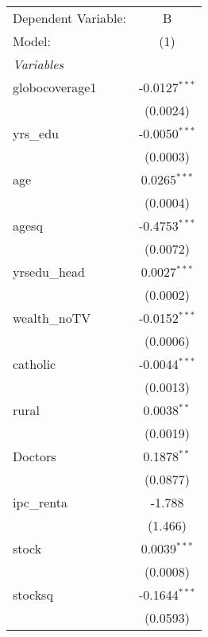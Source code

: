 
\begingroup
\centering
\begin{tabular}{lc}
   \tabularnewline \midrule \midrule
   Dependent Variable:                & B\\  
   Model:                             & (1)\\  
   \midrule
   \emph{Variables}\\
   globocoverage1                     & -0.0127$^{***}$\\   
                                      & (0.0024)\\   
   yrs\_edu                           & -0.0050$^{***}$\\   
                                      & (0.0003)\\   
   age                                & 0.0265$^{***}$\\   
                                      & (0.0004)\\   
   agesq                              & -0.4753$^{***}$\\   
                                      & (0.0072)\\   
   yrsedu\_head                       & 0.0027$^{***}$\\   
                                      & (0.0002)\\   
   wealth\_noTV                       & -0.0152$^{***}$\\   
                                      & (0.0006)\\   
   catholic                           & -0.0044$^{***}$\\   
                                      & (0.0013)\\   
   rural                              & 0.0038$^{**}$\\   
                                      & (0.0019)\\   
   Doctors                            & 0.1878$^{**}$\\   
                                      & (0.0877)\\   
   ipc\_renta                         & -1.788\\   
                                      & (1.466)\\   
   stock                              & 0.0039$^{***}$\\   
                                      & (0.0008)\\   
   stocksq                            & -0.1644$^{***}$\\   
                                      & (0.0593)\\   

\end{tabular}
